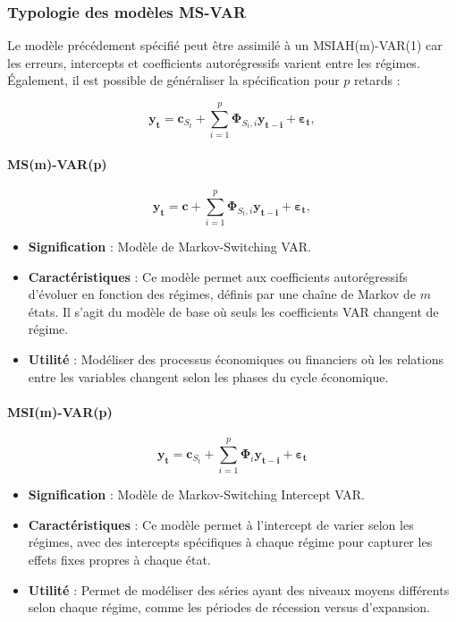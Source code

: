 \begin{sloppypar}
\subsubsection{Typologie des modèles MS-VAR}

Le modèle précédement spécifié peut être assimilé à un MSIAH(m)-VAR(1) car les erreurs, intercepts et coefficients autorégressifs varient entre les régimes. Également, il est possible de généraliser la spécification pour $p$ retards : 

\begin{equation}
    \bm{y_t} = \bm{c}_{S_t} + \sum_{i=1}^{p} \bm{\Phi}_{S_t, i} \bm{y_{t-i}} + \bm{\varepsilon_t},
\end{equation}

\paragraph{MS(m)-VAR(p)}

\begin{equation}
    \bm{y_t} = \bm{c} + \sum_{i=1}^{p} \bm{\Phi}_{S_t, i} \bm{y_{t-i}} + \bm{\varepsilon_t},
\end{equation}

\begin{itemize}
    \item \textbf{Signification} : Modèle de Markov-Switching VAR.
    \item \textbf{Caractéristiques} : Ce modèle permet aux coefficients autorégressifs d’évoluer en fonction des régimes, définis par une chaîne de Markov de $m$ états. Il s’agit du modèle de base où seuls les coefficients VAR changent de régime.
    \item \textbf{Utilité} : Modéliser des processus économiques ou financiers où les relations entre les variables changent selon les phases du cycle économique.
\end{itemize}

\paragraph{MSI(m)-VAR(p)}

\begin{equation}
    \bm{y_t} = \bm{c}_{S_t} + \sum_{i=1}^{p} \bm{\Phi}_i \bm{y_{t-i}} + \bm{\varepsilon_t}
\end{equation}

\begin{itemize}
    \item \textbf{Signification} : Modèle de Markov-Switching Intercept VAR.
    \item \textbf{Caractéristiques} : Ce modèle permet à l’intercept de varier selon les régimes, avec des intercepts spécifiques à chaque régime pour capturer les effets fixes propres à chaque état.
    \item \textbf{Utilité} : Permet de modéliser des séries ayant des niveaux moyens différents selon chaque régime, comme les périodes de récession versus d'expansion.
\end{itemize}


\end{sloppypar}

